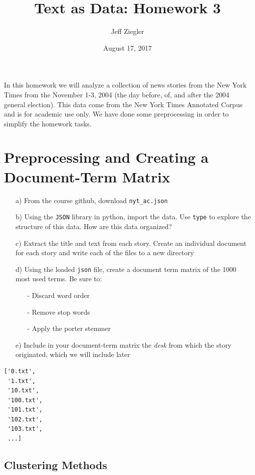 \documentclass[12pt,letterpaper]{article}
\title{Text as Data: Homework 3}
\date{August 17, 2017}
\author{Jeff Ziegler}
\begin{document}
\maketitle

In this homework we will analyze a collection of news stories from the New York Times from the November 1-3, 2004 (the day before, of, and after the 2004 general election). This data come from the New York Times Annotated Corpus and is for academic use only. We have done some preprocessing in order to simplify the homework tasks.


\section{Preprocessing and Creating a Document-Term Matrix}

\begin{itemize}
\item[a)] From the course github, download {\tt nyt\_ac.json} 
\item[b)] Using the {\tt JSON} library in python, import the data. Use {\tt type} to explore the structure of this data. How are this data organized?
\item[c)] Extract the title and text from each story.  Create an individual document for each story and write each of the files to a new directory 
\item[d)] Using the loaded {\tt json} file, create a document term matrix of the 1000 most used terms.  Be sure to: 
\begin{itemize}
\item[-] Discard word order
\item[-] Remove stop words
\item[-] Apply the porter stemmer
\end{itemize}
\item[e)] Include in your document-term matrix the \emph{desk} from which the story originated, which we will include later
\end{itemize}



\begin{Verbatim}
['0.txt',
 '1.txt',
 '10.txt',
 '100.txt',
 '101.txt',
 '102.txt',
 '103.txt',
 ...]
\end{Verbatim}



\subsection*{Clustering Methods}
\end{document}
